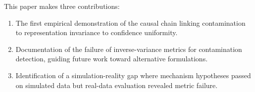 This paper makes three contributions:

\begin{enumerate}
\item The first empirical demonstration of the causal chain linking contamination to representation invariance to confidence uniformity.
\item Documentation of the failure of inverse-variance metrics for contamination detection, guiding future work toward alternative formulations.
\item Identification of a simulation-reality gap where mechanism hypotheses passed on simulated data but real-data evaluation revealed metric failure.
\end{enumerate}
